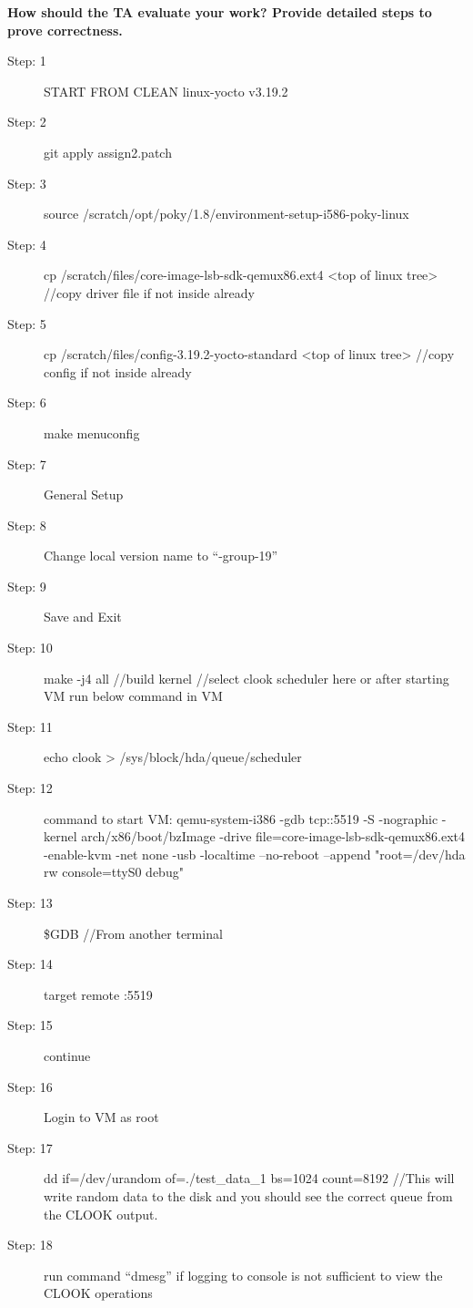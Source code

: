 \documentclass[10pt,letterpaper,draftclsnofoot,onecolumn]{IEEEtran}
\begin{document}
\noindent\textbf{How should the TA evaluate your work? Provide detailed steps to prove correctness.}
\begin{description}
\item [Step: 1] START FROM CLEAN linux-yocto v3.19.2
\item [Step: 2] git apply assign2.patch
\item [Step: 3] source /scratch/opt/poky/1.8/environment-setup-i586-poky-linux
\item [Step: 4] cp /scratch/files/core-image-lsb-sdk-qemux86.ext4 <top of linux tree> \newline //copy driver file if not inside already
\item [Step: 5] cp /scratch/files/config-3.19.2-yocto-standard <top of linux tree> \newline//copy config if not inside already
\item [Step: 6] make menuconfig
\item [Step: 7] General Setup
\item [Step: 8] Change local version name to “-group-19”
\item [Step: 9] Save and Exit
\item [Step: 10] make -j4 all \newline //build kernel \newline //select clook scheduler here or after starting VM run below command in VM
\item [Step: 11] echo clook > /sys/block/hda/queue/scheduler
\item [Step: 12] command to start VM: \newline qemu-system-i386 -gdb tcp::5519 -S -nographic -kernel arch/x86/boot/bzImage -drive file=core-image-lsb-sdk-qemux86.ext4 -enable-kvm -net none -usb -localtime --no-reboot --append "root=/dev/hda rw console=ttyS0 debug"
\item [Step: 13] \$GDB \newline //From another terminal
\item [Step: 14] target remote :5519
\item [Step: 15] continue
\item [Step: 16] Login to VM as root
\item [Step: 17] dd if=/dev/urandom of=./test\_data\_1 bs=1024 count=8192 \newline //This will write random data to the disk and you should see the correct queue from the CLOOK output. 
\item [Step: 18] run command “dmesg” if logging to console is not sufficient to view the CLOOK operations

\end{description}



\end{document}

